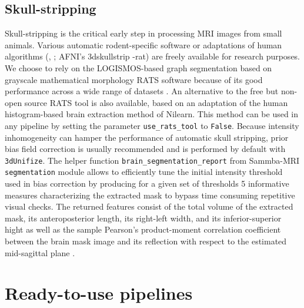 \documentclass[utf8, a4paper, final, crop]{frontiersSCNS}
\newcommand{\pythoninline}[1]{\texttt{#1}}
\newcommand{\bashinline}[1]{\texttt{#1}}
\newcommand\Ccancel[1]{\renewcommand\CancelColor{\color{red}}\xcancel{#1}}
\begin{document}
\subsection{Skull-stripping}
Skull-stripping is the critical early step in processing
MRI images from small animals. Various automatic rodent-specific 
software\Ccancel{s} \citep{chou2011robust, oguz2014rats} or adaptations of human algorithms (\citeauthor{wood2013rbet}, \citeyear{wood2013rbet}; AFNI's 3dskullstrip -rat)
are freely available for research purposes. We choose to rely on
the LOGISMOS-based graph segmentation \citep{yin2010logimos} based on grayscale mathematical morphology 
RATS software  \citep{oguz2014rats} because
of its good performance across a wide range of datasets \citep{sargolzaei2018comparative}.
An alternative to the free but non-open source RATS tool is also 
available, based on an adaptation of the 
human histogram-based brain extraction method of Nilearn. 
This method can be used in any pipeline by setting the parameter
 \pythoninline{use_rats_tool} to \pythoninline{False}.
Because intensity inhomogeneity can hamper the performance of automatic skull stripping,
prior bias field correction
is usually recommended \citep{sled1998nonparametric} and is performed by default with \bashinline{3dUnifize}.
The helper function \pythoninline{brain_segmentation_report}
from Sammba-MRI \pythoninline{segmentation} module allows to
efficiently tune the initial intensity threshold used in bias correction by
producing for a given set of thresholds 5 informative measures
characterizing the extracted mask to bypass 
time consuming repetitive visual checks.
The returned features consist of the total volume of
the extracted mask, its 
anteroposterior length, its right-left width, and its inferior-superior hight as well
as the sample Pearson's product-moment correlation
coefficient between the brain mask image and its reflection
with respect to the estimated mid-sagittal plane
\citep{powell2016fully}.

\section{Ready-to-use pipelines}
\end{document}

